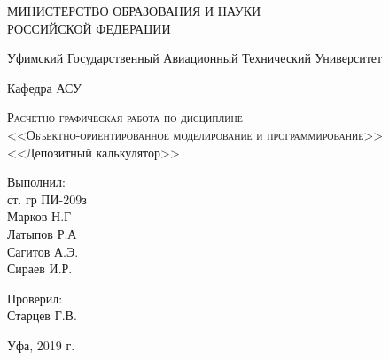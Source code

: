 
\begin{titlepage}
	\begin{center}
		\large
		МИНИСТЕРСТВО ОБРАЗОВАНИЯ И НАУКИ\\ РОССИЙСКОЙ ФЕДЕРАЦИИ
		
		\vspace{0.5cm}
		
		\large
		Уфимский Государственный Авиационный Технический Университет
		\vspace{0.25cm}
		
		\hfill
		Кафедра АСУ
		\vfill
		
		\textsc{Расчетно-графическая работа по дисциплине\\
		<<Объектно-ориентированное моделирование и программирование>>}\\[5mm]
		
		
		{\LARGE <<Депозитный калькулятор>>}
		\bigskip
	\end{center}
	\vfill
\begin{flushright}
Выполнил:\\ст. гр ПИ-209з\\Марков Н.Г\\Латыпов Р.А\\Сагитов А.Э.\\Сираев И.Р.
\end{flushright}
\bigskip
\begin{flushright}
Проверил:\\Старцев Г.В.
\end{flushright}
\bigskip
	\begin{center}
		Уфа, 2019 г.
	\end{center}
\end{titlepage}